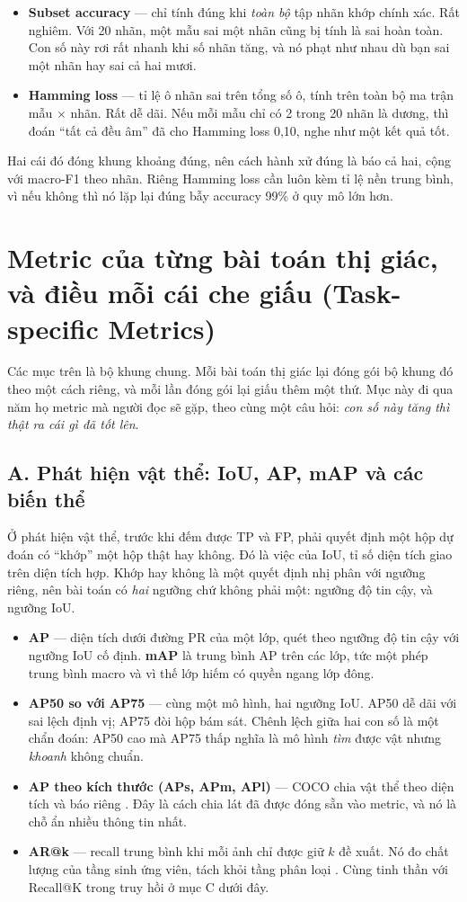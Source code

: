 \documentclass[../../deep_learning.tex]{subfiles}
\begin{document}
\begin{itemize}
\item \textbf{Subset accuracy} --- chỉ tính đúng khi \emph{toàn bộ} tập nhãn khớp chính xác. Rất nghiêm. Với 20 nhãn, một mẫu sai một nhãn cũng bị tính là sai hoàn toàn. Con số này rơi rất nhanh khi số nhãn tăng, và nó phạt như nhau dù bạn sai một nhãn hay sai cả hai mươi.
\item \textbf{Hamming loss} --- tỉ lệ ô nhãn sai trên tổng số ô, tính trên toàn bộ ma trận mẫu \(\times\) nhãn. Rất dễ dãi. Nếu mỗi mẫu chỉ có 2 trong 20 nhãn là dương, thì đoán ``tất cả đều âm'' đã cho Hamming loss 0{,}10, nghe như một kết quả tốt.
\end{itemize}

Hai cái đó đóng khung khoảng đúng, nên cách hành xử đúng là báo cả hai, cộng với macro-F1 theo nhãn. Riêng Hamming loss cần luôn kèm tỉ lệ nền trung bình, vì nếu không thì nó lặp lại đúng bẫy accuracy 99\% ở quy mô lớn hơn.
\section{Metric của từng bài toán thị giác, và điều mỗi cái che giấu (Task-specific Metrics)}
Các mục trên là bộ khung chung. Mỗi bài toán thị giác lại đóng gói bộ khung đó theo một cách riêng, và mỗi lần đóng gói lại giấu thêm một thứ. Mục này đi qua năm họ metric mà người đọc sẽ gặp, theo cùng một câu hỏi: \emph{con số này tăng thì thật ra cái gì đã tốt lên}.

\subsection{A. Phát hiện vật thể: IoU, AP, mAP và các biến thể}
Ở phát hiện vật thể, trước khi đếm được TP và FP, phải quyết định một hộp dự đoán có ``khớp'' một hộp thật hay không. Đó là việc của IoU, tỉ số diện tích giao trên diện tích hợp. Khớp hay không là một quyết định nhị phân với ngưỡng riêng, nên bài toán có \emph{hai} ngưỡng chứ không phải một: ngưỡng độ tin cậy, và ngưỡng IoU.

\begin{itemize}
\item \textbf{AP} --- diện tích dưới đường PR của một lớp, quét theo ngưỡng độ tin cậy với ngưỡng IoU cố định. \textbf{mAP} là trung bình AP trên các lớp, tức một phép trung bình macro và vì thế lớp hiếm có quyền ngang lớp đông.
\item \textbf{AP50 so với AP75} --- cùng một mô hình, hai ngưỡng IoU. AP50 dễ dãi với sai lệch định vị; AP75 đòi hộp bám sát. Chênh lệch giữa hai con số là một chẩn đoán: AP50 cao mà AP75 thấp nghĩa là mô hình \emph{tìm} được vật nhưng \emph{khoanh} không chuẩn.
\item \textbf{AP theo kích thước (APs, APm, APl)} --- COCO chia vật thể theo diện tích và báo riêng \cite{lin2014coco}. Đây là cách chia lát đã được đóng sẵn vào metric, và nó là chỗ ẩn nhiều thông tin nhất.
\item \textbf{AR@k} --- recall trung bình khi mỗi ảnh chỉ được giữ \(k\) đề xuất. Nó đo chất lượng của tầng sinh ứng viên, tách khỏi tầng phân loại \cite{hosang2016proposals}. Cùng tinh thần với Recall@K trong truy hồi ở mục C dưới đây.
\end{itemize}
\end{document}
